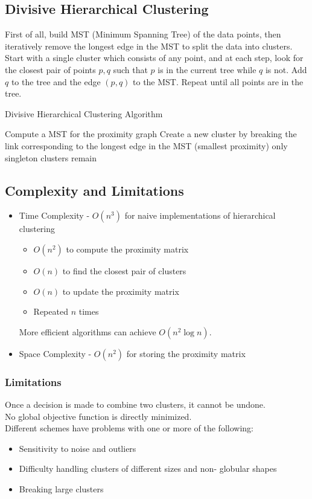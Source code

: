 \subsection{Divisive Hierarchical Clustering}
First of all, build MST (Minimum Spanning Tree) of the data points, then iteratively remove the longest edge in the MST to split the data into clusters.\\
Start with a single cluster which consists of any point, and at each step, look for the closest pair of points $p,q$ such that $p$ is in the current tree while $q$ is not.
Add $q$ to the tree and the edge $(p,q)$ to the MST. Repeat until all points are in the tree.

\begin{algorithm}[H]
\caption{Divisive Hierarchical Clustering Algorithm}
\begin{algorithmic}[1]
\State Compute a MST for the proximity graph
\Repeat
\State Create a new cluster by breaking the link corresponding to the longest edge in the MST (smallest proximity)
\Until only singleton clusters remain
\end{algorithmic}
\end{algorithm}

\subsection{Complexity and Limitations}
\begin{itemize}
	\item Time Complexity - $O(n^3)$ for naive implementations of hierarchical clustering
	      \begin{itemize}
		      \item $O(n^2)$ to compute the proximity matrix
		      \item $O(n)$ to find the closest pair of clusters
		      \item $O(n)$ to update the proximity matrix
		      \item Repeated $n$ times
	      \end{itemize}
	More efficient algorithms can achieve $O(n^2 \log n)$.
	\item Space Complexity - $O(n^2)$ for storing the proximity matrix
\end{itemize}

\subsubsection{Limitations}
Once a decision is made to combine two clusters,
it cannot be undone.\\
No global objective function is directly minimized.\\
Different schemes have problems with one or
more of the following:
\begin{itemize}
	\item Sensitivity to noise and outliers
	\item Difficulty handling clusters of different sizes and non-
globular shapes
	\item Breaking large clusters
\end{itemize}

